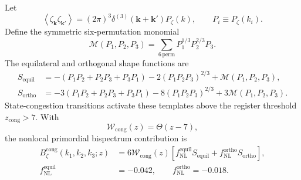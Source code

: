 \documentclass[11pt,letterpaper]{article}
\theoremstyle{plain}
\begin{document}
Let
\begin{equation}
\label{eq:shbt-zeta-two-point}
 \left\langle
 \zeta_{\mathbf k}\zeta_{\mathbf k'}
 \right\rangle
 =
 (2\pi)^3
 \delta^{(3)}(\mathbf k+\mathbf k')
 P_\zeta(k),
 \qquad
 P_i\equiv P_\zeta(k_i).
\end{equation}
Define the symmetric six-permutation monomial
\begin{equation}
\label{eq:shbt-bispectrum-mixed-monomial}
 \mathcal M(P_1,P_2,P_3)
 =
 \sum_{\mathrm{6\,perm}}
 P_1^{1/3}P_2^{2/3}P_3.
\end{equation}
The equilateral and orthogonal shape functions are
\begin{align}
\label{eq:shbt-equilateral-shape}
 S_{\text{equil}}
 &=
 -\left(P_1P_2+P_2P_3+P_3P_1\right)
 -2(P_1P_2P_3)^{2/3}
 +\mathcal M(P_1,P_2,P_3),
 \\
\label{eq:shbt-orthogonal-shape}
 S_{\text{ortho}}
 &=
 -3\left(P_1P_2+P_2P_3+P_3P_1\right)
 -8(P_1P_2P_3)^{2/3}
 +3\mathcal M(P_1,P_2,P_3).
\end{align}
State-congestion transitions activate these templates above the register
threshold \(z_{\text{cong}}>7\).  With
\begin{equation}
\label{eq:shbt-congestion-window}
 \mathcal W_{\text{cong}}(z)
 =
 \Theta(z-7),
\end{equation}
the nonlocal primordial bispectrum contribution is
\begin{align}
\label{eq:shbt-congestion-bispectrum}
 B_\zeta^{\text{cong}}(k_1,k_2,k_3;z)
 &=
 6\mathcal W_{\text{cong}}(z)
 \left[
 f_{\text{NL}}^{\text{equil}}S_{\text{equil}}
 +
 f_{\text{NL}}^{\text{ortho}}S_{\text{ortho}}
 \right],
 \\
 f_{\text{NL}}^{\text{equil}}
 &=
 -0.042,
 \qquad
 f_{\text{NL}}^{\text{ortho}}
 =
 -0.018.
\end{align}
\end{document}
